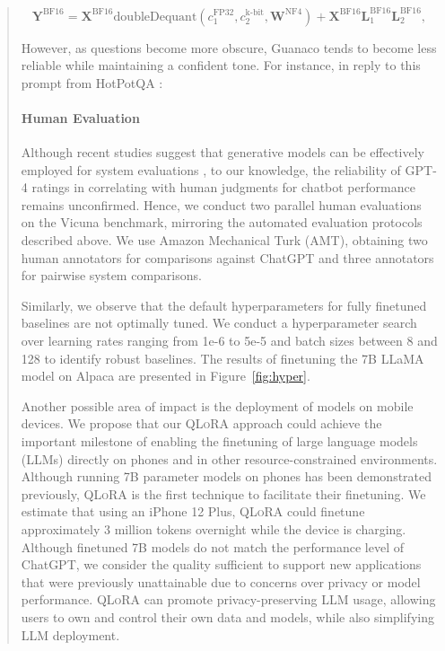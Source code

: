 \begin{quote}
\begin{equation}
    \mathbf{Y}^{\text{BF16}} =  \mathbf{X}^{\text{BF16}} \text{doubleDequant}(c_1^{\text{FP32}}, c_2^{\text{k-bit}}, \mathbf{W}^{\text{NF4}}) + \mathbf{X}^{\text{BF16}}\mathbf{L}^{\text{BF16}}_1\mathbf{L}^{\text{BF16}}_2,
\end{equation}

However, as questions become more obscure, {Guanaco} tends to become less reliable while maintaining a confident tone. For instance, in reply to this prompt from HotPotQA \citep{yang2018hotpotqa}:  

\paragraph{Human Evaluation} Although recent studies suggest that generative models can be effectively employed for system evaluations \citep{fu2023gptscore}, to our knowledge, the reliability of GPT-4 ratings in correlating with human judgments for chatbot performance remains unconfirmed. Hence, we conduct two parallel human evaluations on the Vicuna benchmark, mirroring the automated evaluation protocols described above. We use Amazon Mechanical Turk (AMT), obtaining two human annotators for comparisons against ChatGPT and three annotators for pairwise system comparisons.

Similarly, we observe that the default hyperparameters for fully finetuned baselines are not optimally tuned. We conduct a hyperparameter search over learning rates ranging from 1e-6 to 5e-5 and batch sizes between 8 and 128 to identify robust baselines. The results of finetuning the 7B LLaMA model on Alpaca are presented in Figure~\ref{fig:hyper}.

Another possible area of impact is the deployment of models on mobile devices. We propose that our \textsc{QLoRA} approach could achieve the important milestone of enabling the finetuning of large language models (LLMs) directly on phones and in other resource-constrained environments. Although running 7B parameter models on phones has been demonstrated previously, \textsc{QLoRA} is the first technique to facilitate their finetuning. We estimate that using an iPhone 12 Plus, \textsc{QLoRA} could finetune approximately 3 million tokens overnight while the device is charging. Although finetuned 7B models do not match the performance level of ChatGPT, we consider the quality sufficient to support new applications that were previously unattainable due to concerns over privacy or model performance. \textsc{QLoRA} can promote privacy-preserving LLM usage, allowing users to own and control their own data and models, while also simplifying LLM deployment.


\end{quote}
